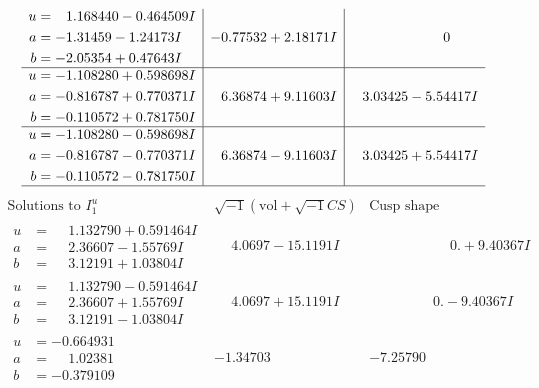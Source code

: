 \documentclass[1p]{elsarticle_modified}
\theoremstyle{definition}
\newcommand{\I}{\sqrt{-1}}
\begin{document}
$$\begin{array}{c|c|c}
\begin{aligned}
u &= \phantom{-}1.168440 - 0.464509 I \\
a &= -1.31459 - 1.24173 I \\
b &= -2.05354 + 0.47643 I\end{aligned}
 & -0.77532 + 2.18171 I & \phantom{-0.000000 } 0 \\ \hline\begin{aligned}
u &= -1.108280 + 0.598698 I \\
a &= -0.816787 + 0.770371 I \\
b &= -0.110572 + 0.781750 I\end{aligned}
 & \phantom{-}6.36874 + 9.11603 I & \phantom{-}3.03425 - 5.54417 I \\ \hline\begin{aligned}
u &= -1.108280 - 0.598698 I \\
a &= -0.816787 - 0.770371 I \\
b &= -0.110572 - 0.781750 I\end{aligned}
 & \phantom{-}6.36874 - 9.11603 I & \phantom{-}3.03425 + 5.54417 I\\
 \hline 
 \end{array}$$\newpage$$\begin{array}{c|c|c}  
\text{Solutions to }I^u_{1}& \I (\text{vol} + \sqrt{-1}CS) & \text{Cusp shape}\\
 \hline 
\begin{aligned}
u &= \phantom{-}1.132790 + 0.591464 I \\
a &= \phantom{-}2.36607 - 1.55769 I \\
b &= \phantom{-}3.12191 + 1.03804 I\end{aligned}
 & \phantom{-}4.0697 - 15.1191 I & \phantom{-0.000000 -}0. + 9.40367 I \\ \hline\begin{aligned}
u &= \phantom{-}1.132790 - 0.591464 I \\
a &= \phantom{-}2.36607 + 1.55769 I \\
b &= \phantom{-}3.12191 - 1.03804 I\end{aligned}
 & \phantom{-}4.0697 + 15.1191 I & \phantom{-0.000000 } 0. - 9.40367 I \\ \hline\begin{aligned}
u &= -0.664931\phantom{ +0.000000I} \\
a &= \phantom{-}1.02381\phantom{ +0.000000I} \\
b &= -0.379109\phantom{ +0.000000I}\end{aligned}
 & -1.34703\phantom{ +0.000000I} & -7.25790\phantom{ +0.000000I} \\ \hline\begin{aligned}

\end{aligned}
\end{array}$$
\end{document}
